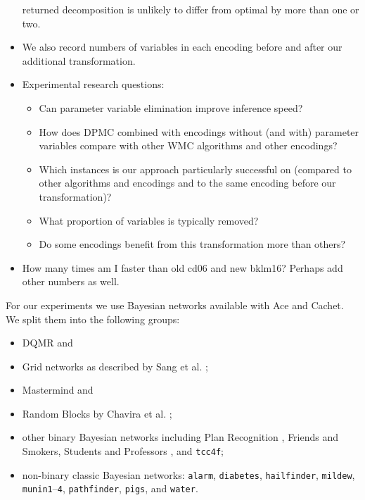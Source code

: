 \documentclass[runningheads]{llncs}
\begin{document}
\begin{itemize}
  returned decomposition is unlikely to differ from optimal by more than one or
  two.
\item We also record numbers of variables in each encoding before and after our
  additional transformation.
\item Experimental research questions:
  \begin{itemize}
  \item Can parameter variable elimination improve inference speed?
  \item How does DPMC combined with encodings without (and with) parameter
    variables compare with other WMC algorithms and other encodings?
  \item Which instances is our approach particularly successful on (compared to
    other algorithms and encodings and to the same encoding before our
    transformation)?
  \item What proportion of variables is typically removed?
  \item Do some encodings benefit from this transformation more than others?
  \end{itemize}
\item How many times am I faster than old cd06 and new bklm16? Perhaps add other
  numbers as well.
\end{itemize}

For our experiments we use Bayesian networks available with \textsf{Ace} and
\textsf{Cachet}. We split them into the following groups:
\begin{itemize}
\item DQMR and
\item Grid networks as described by Sang et al. \cite{DBLP:conf/aaai/SangBK05};
\item Mastermind and
\item Random Blocks by Chavira et al. \cite{DBLP:journals/ijar/ChaviraDJ06};
\item other binary Bayesian networks including Plan Recognition
  \cite{DBLP:conf/aaai/SangBK05}, Friends and Smokers, Students and Professors
  \cite{DBLP:journals/ijar/ChaviraDJ06}, and \texttt{tcc4f};
\item non-binary classic Bayesian networks: \texttt{alarm}, \texttt{diabetes},
  \texttt{hailfinder}, \texttt{mildew}, \texttt{munin1}--\texttt{4},
  \texttt{pathfinder}, \texttt{pigs}, and \texttt{water}.
\end{itemize}
\end{document}
